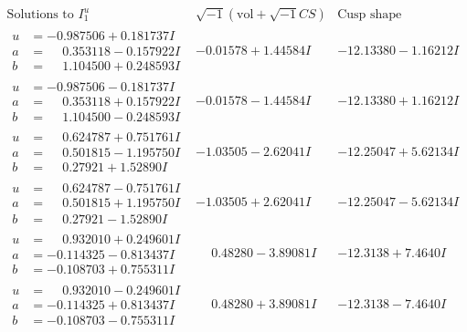 \documentclass[1p]{elsarticle_modified}
\theoremstyle{definition}
\newcommand{\I}{\sqrt{-1}}
\begin{document}
$$\begin{array}{c|c|c}  
\text{Solutions to }I^u_{1}& \I (\text{vol} + \sqrt{-1}CS) & \text{Cusp shape}\\
 \hline 
\begin{aligned}
u &= -0.987506 + 0.181737 I \\
a &= \phantom{-}0.353118 - 0.157922 I \\
b &= \phantom{-}1.104500 + 0.248593 I\end{aligned}
 & -0.01578 + 1.44584 I & -12.13380 - 1.16212 I \\ \hline\begin{aligned}
u &= -0.987506 - 0.181737 I \\
a &= \phantom{-}0.353118 + 0.157922 I \\
b &= \phantom{-}1.104500 - 0.248593 I\end{aligned}
 & -0.01578 - 1.44584 I & -12.13380 + 1.16212 I \\ \hline\begin{aligned}
u &= \phantom{-}0.624787 + 0.751761 I \\
a &= \phantom{-}0.501815 - 1.195750 I \\
b &= \phantom{-}0.27921 + 1.52890 I\end{aligned}
 & -1.03505 - 2.62041 I & -12.25047 + 5.62134 I \\ \hline\begin{aligned}
u &= \phantom{-}0.624787 - 0.751761 I \\
a &= \phantom{-}0.501815 + 1.195750 I \\
b &= \phantom{-}0.27921 - 1.52890 I\end{aligned}
 & -1.03505 + 2.62041 I & -12.25047 - 5.62134 I \\ \hline\begin{aligned}
u &= \phantom{-}0.932010 + 0.249601 I \\
a &= -0.114325 - 0.813437 I \\
b &= -0.108703 + 0.755311 I\end{aligned}
 & \phantom{-}0.48280 - 3.89081 I & -12.3138 + 7.4640 I \\ \hline\begin{aligned}
u &= \phantom{-}0.932010 - 0.249601 I \\
a &= -0.114325 + 0.813437 I \\
b &= -0.108703 - 0.755311 I\end{aligned}
 & \phantom{-}0.48280 + 3.89081 I & -12.3138 - 7.4640 I \\ \hline\begin{aligned}

\end{aligned}
\end{array}$$
\end{document}
